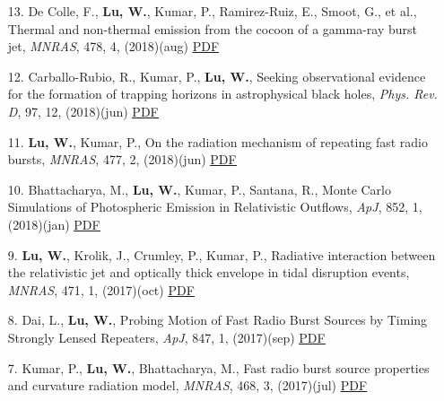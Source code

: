 \begin{itemize}[leftmargin=0.65cm]
\vspace{-0.1cm}
\item[13.]{De Colle, F., {\bf Lu, W.}, Kumar, P., Ramirez-Ruiz, E., Smoot, G., et al., {Thermal and non-thermal emission from the cocoon of a gamma-ray burst jet}, {\it MNRAS}, 478, 4, (2018)(aug) \href{https://ui.adsabs.harvard.edu/abs/2018MNRAS.478.4553D}{\underline{PDF}}}

\vspace{-0.1cm}
\item[12.]{Carballo-Rubio, R., Kumar, P., {\bf Lu, W.}, {Seeking observational evidence for the formation of trapping horizons in astrophysical black holes}, {\it Phys. Rev. D}, 97, 12, (2018)(jun) \href{https://ui.adsabs.harvard.edu/abs/2018PhRvD..97l3012C}{\underline{PDF}}}

\vspace{-0.1cm}
\item[11.]{{\bf Lu, W.}, Kumar, P., {On the radiation mechanism of repeating fast radio bursts}, {\it MNRAS}, 477, 2, (2018)(jun) \href{https://ui.adsabs.harvard.edu/abs/2018MNRAS.477.2470L}{\underline{PDF}}}

\vspace{-0.1cm}
\item[10.]{Bhattacharya, M., {\bf Lu, W.}, Kumar, P., Santana, R., {Monte Carlo Simulations of Photospheric Emission in Relativistic Outflows}, {\it ApJ}, 852, 1, (2018)(jan) \href{https://ui.adsabs.harvard.edu/abs/2018ApJ...852...24B}{\underline{PDF}}}

\vspace{-0.1cm}
\item[9.]{{\bf Lu, W.}, Krolik, J., Crumley, P., Kumar, P., {Radiative interaction between the relativistic jet and optically thick envelope in tidal disruption events}, {\it MNRAS}, 471, 1, (2017)(oct) \href{https://ui.adsabs.harvard.edu/abs/2017MNRAS.471.1141L}{\underline{PDF}}}

\vspace{-0.1cm}
\item[8.]{Dai, L., {\bf Lu, W.}, {Probing Motion of Fast Radio Burst Sources by Timing Strongly Lensed Repeaters}, {\it ApJ}, 847, 1, (2017)(sep) \href{https://ui.adsabs.harvard.edu/abs/2017ApJ...847...19D}{\underline{PDF}}}

\vspace{-0.1cm}
\item[7.]{Kumar, P., {\bf Lu, W.}, Bhattacharya, M., {Fast radio burst source properties and curvature radiation model}, {\it MNRAS}, 468, 3, (2017)(jul) \href{https://ui.adsabs.harvard.edu/abs/2017MNRAS.468.2726K}{\underline{PDF}}}


\end{itemize}
